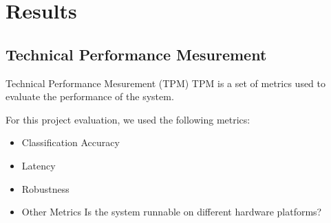 \section{Results}

\subsection*{Technical Performance Mesurement}
\begin{frame}{Technical Performance Mesurement (TPM)}
    TPM is a set of metrics used to evaluate the performance of the system.

    \vspace*{.5cm}
    For this project evaluation, we used the following metrics:
    \begin{itemize}
        \item Classification Accuracy
        \item Latency
        \item Robustness
        \item Other Metrics \textendash{} Is the system runnable on different hardware platforms? 
    \end{itemize}
\end{frame}


